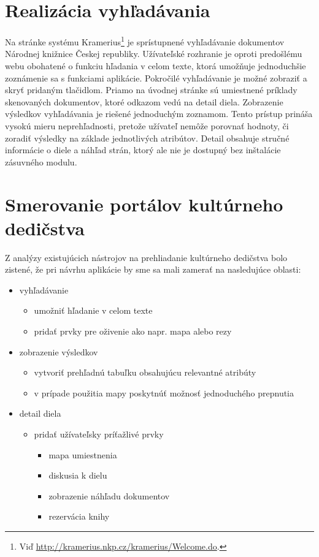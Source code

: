 \documentclass[
  print, %
  table,   %
  lof,     %
  nolot,     %
]{fithesis3}
\begin{document}
\section{Realizácia vyhľadávania}
Na stránke systému Kramerius\footnote{Viď \url{http://kramerius.nkp.cz/kramerius/Welcome.do}.} je sprístupnené vyhľadávanie dokumentov Národnej knižnice Českej republiky. Užívateľské rozhranie je oproti predošlému webu obohatené o funkciu hľadania v celom texte, ktorá umožňuje jednoduchšie zoznámenie sa s funkciami aplikácie. Pokročilé vyhľadávanie je možné zobraziť a skryť pridaným tlačidlom. Priamo na úvodnej stránke sú umiestnené príklady skenovaných dokumentov, ktoré odkazom vedú na detail diela. Zobrazenie výsledkov vyhľadávania je riešené jednoduchým zoznamom. Tento prístup prináša vysokú mieru neprehľadnosti, pretože užívateľ nemôže porovnať hodnoty, či zoradiť výsledky na základe jednotlivých atribútov. Detail obsahuje
stručné informácie o diele a náhľad strán, ktorý ale nie je dostupný bez inštalácie zásuvného modulu. 
\section{Smerovanie portálov kultúrneho dedičstva}
Z analýzy existujúcich nástrojov na prehliadanie kultúrneho dedičstva bolo zistené, že pri návrhu aplikácie by sme sa mali zamerať na nasledujúce oblasti:
\begin{itemize}
	\item vyhľadávanie
	\begin{itemize}
		\item umožniť hľadanie v celom texte 
		\item pridať prvky pre oživenie ako napr. mapa alebo rezy
	\end{itemize}
	\item zobrazenie výsledkov
	\begin{itemize}
		\item vytvoriť prehľadnú tabuľku obsahujúcu relevantné atribúty
		\item v prípade použitia mapy poskytnúť možnosť jednoduchého prepnutia 
	\end{itemize}
	\item detail diela
	\begin{itemize}
		\item pridať užívateľsky príťažlivé prvky
		\begin{itemize}
			\item mapa umiestnenia				
			\item diskusia k dielu
			\item zobrazenie náhľadu dokumentov
			\item rezervácia knihy
		\end{itemize}
	\end{itemize}	
\end{itemize}
\end{document}
